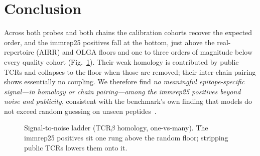 \section{Conclusion}\label{sec:conclusion}

Across both probes and both chains the calibration cohorts recover the expected
order, and the immrep25 positives fall at the bottom, just above the real-repertoire
(AIRR) and OLGA floors and one to three orders of magnitude below every quality cohort
(Fig.~\ref{fig:ladder}). Their weak homology is contributed by public TCRs and
collapses to the floor when those are removed; their inter-chain pairing shows
essentially no coupling. We therefore find \emph{no meaningful epitope-specific
signal---in homology or chain pairing---among the immrep25 positives beyond noise and
publicity}, consistent with the benchmark's own finding that models do not exceed
random guessing on unseen peptides~\cite{Richardson2026}.

\begin{figure}[h]\centering
{}
\caption{Signal-to-noise ladder (TCR$\beta$ homology, one-vs-many). The immrep25
positives sit one rung above the random floor; stripping public TCRs lowers them
onto it.}
\label{fig:ladder}
\end{figure}

